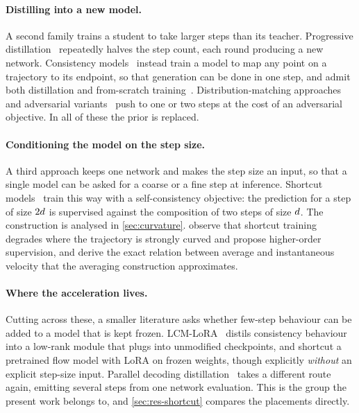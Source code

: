 \paragraph{Distilling into a new model.} A second family trains a student to
take larger steps than its teacher. Progressive
distillation~\citep{salimans2022progressive} repeatedly halves the step
count, each round producing a new network. Consistency
models~\citep{song2023consistency} instead train a model to map any point on
a trajectory to its endpoint, so that generation can be done in one step,
and admit both distillation and from-scratch
training~\citep{song2024ict, luo2023lcm}. Distribution-matching
approaches~\citep{yin2024dmd, yin2024dmd2} and adversarial
variants~\citep{sauer2023add, sauer2024ladd} push to one or two steps at the
cost of an adversarial objective. In all of these the prior is replaced.

\paragraph{Conditioning the model on the step size.} A third approach keeps
one network and makes the step size an input, so that a single model can be
asked for a coarse or a fine step at inference. Shortcut
models~\citep{frans2025shortcut} train this way with a self-consistency
objective: the prediction for a step of size $2d$ is supervised against
the composition of two steps of size $d$. The construction is analysed
in \cref{sec:curvature}. \citet{chen2025homo} observe that shortcut training
degrades where the trajectory is strongly curved and propose higher-order
supervision, and \citet{geng2025meanflow} derive the exact relation between
average and instantaneous velocity that the averaging construction
approximates.

\paragraph{Where the acceleration lives.} Cutting across these,
a smaller literature asks whether few-step behaviour can be added to a
model that is kept frozen. LCM-LoRA~\citep{luo2023lcmlora} distils
consistency behaviour into a low-rank module that plugs into unmodified
checkpoints, and \citet{cai2025scfm} shortcut a pretrained flow model with
LoRA on frozen weights, though explicitly \emph{without} an explicit
step-size input. Parallel decoding
distillation~\citep{shaul2026pdd} takes a different route again, emitting
several steps from one network evaluation. This is the group the present
work belongs to, and \cref{sec:res-shortcut} compares the placements
directly.

